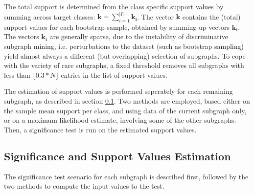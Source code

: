 \documentclass{article}
\begin{document}
The total support is determined from the class specific
support values by summing across target classes: $\mathbf{k}=\sum_{i=1}^{\vert I\vert} \mathbf{k_i}$.
The vector $\mathbf{k}$ contains the (total) support values for each
bootstrap sample, obtained by summing up vectors $\mathbf{k_i}$. 
The vectors $\mathbf{k_i}$ are generally sparse, due to the
instability of discriminative subgraph mining, i.e. perturbations to the
dataset (such as bootstrap sampling) yield almost always a different (but overlapping) selection of
subgraphs. To cope with the variety of rare subgraphs, a fixed threshold removes all subgraphs with less than
$\lfloor0.3*N\rfloor$ entries in the list of support values.

The estimation of support values is performed seperately for each remaining
subgraph, as described in section \ref{s:significance-estimation}. Two methods
are employed, based either on the sample mean support per class, and using data
of the current subgraph only, or on a maximum likelihood estimate, involving
some of the other subgraphs.  Then, a significance test is run on the estimated
support values. 

\subsection{Significance and Support Values Estimation}
\label{s:significance-estimation}
The significance test scenario for each subgraph is described first, followed by the two methods to
compute the input values to the test.
\end{document}
